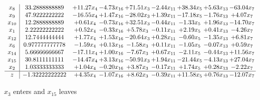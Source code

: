 \documentclass[9pt]{article}
\begin{document}
 \[\begin{array}{c| c c@{\hskip 2pt} c@{\hskip 2pt} c@{\hskip 2pt} c@{\hskip 2pt} c@{\hskip 2pt} c@{\hskip 2pt} c@{\hskip 2pt} }
 x_{8}   &  33.2888888889 & + 11.27 x_{4} & -4.73 x_{16} & + 71.51 x_{3} & -2.44 x_{11} & + 38.34 x_{5} & +  5.63 x_{13} & -63.04 x_{7}\\
 x_{9}   &  47.9222222222 & -16.55 x_{4} & +  1.47 x_{16} & -28.02 x_{3} & +  1.39 x_{11} & -17.18 x_{5} & -1.76 x_{13} & +  4.07 x_{7}\\
 x_{10}   &  12.2888888889 & +  0.61 x_{4} & -0.73 x_{16} & + 32.51 x_{3} & -0.44 x_{11} & -1.33 x_{5} & +  1.96 x_{13} & -14.70 x_{7}\\
 x_{1}   &  2.22222222222 & +  0.52 x_{4} & -0.33 x_{16} & +  5.78 x_{3} & -0.11 x_{11} & +  2.19 x_{5} & +  0.41 x_{13} & -4.26 x_{7}\\
 x_{12}   &  12.7444444444 & +  1.77 x_{4} & +  1.53 x_{16} & -20.64 x_{3} & +  0.28 x_{11} & -0.60 x_{5} & -1.35 x_{13} & +  6.81 x_{7}\\
 x_{6}   &  0.977777777778 & -1.59 x_{4} & +  0.13 x_{16} & -1.58 x_{3} & +  0.11 x_{11} & -1.05 x_{5} & -0.07 x_{13} & +  0.59 x_{7}\\
 x_{14}   &  5.66666666667 & -17.11 x_{4} & +  1.00 x_{16} & -7.67 x_{3} & +  0.67 x_{11} & -2.11 x_{5} & -0.44 x_{13} & + 11.56 x_{7}\\
 x_{15}   &  30.8111111111 & -14.47 x_{4} & +  3.13 x_{16} & -50.91 x_{3} & +  1.94 x_{11} & -21.44 x_{5} & -4.13 x_{13} & + 27.04 x_{7}\\
 x_{2}   &  1.03333333333 & +  1.04 x_{4} & -0.20 x_{16} & +  3.87 x_{3} & -0.17 x_{11} & +  1.74 x_{5} & +  0.28 x_{13} & -2.22 x_{7}\\
\hline
z    &  -1.32222222222 & +  4.35 x_{4} & -1.07 x_{16} & +  8.62 x_{3} & -0.39 x_{11} & + 11.58 x_{5} & +  0.76 x_{13} & -12.07 x_{7}\\
\end{array}\]


 $ x_{3} $ enters and $ x_{15} $ leaves 
\end{document}
